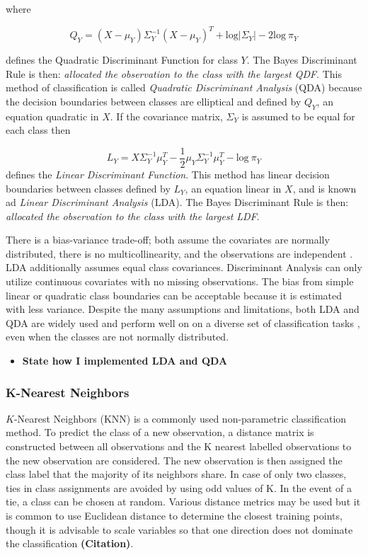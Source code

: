 \documentclass[12pt,]{article}
\providecommand{\tightlist}{%
  \setlength{\itemsep}{0pt}\setlength{\parskip}{0pt}}
\begin{document}
where

\[
Q_Y = (X - \mu_Y) \Sigma^{-1}_Y (X - \mu_Y)^T + \text{log} \vert \Sigma_Y \vert - 2\text{log} ~\pi_Y   \tag{5}
\]

defines the Quadratic Discriminant Function for class \(Y\). The Bayes
Discriminant Rule is then: \emph{allocated the observation to the class
with the largest QDF}. This method of classification is called
\emph{Quadratic Discriminant Analysis} (QDA) because the decision
boundaries between classes are elliptical and defined by \(Q_Y\), an
equation quadratic in \(X\). If the covariance matrix, \(\Sigma_Y\) is
assumed to be equal for each class then

\[
L_Y = X \Sigma^{-1}_Y \mu_Y^T -\frac{1}{2}\mu_Y \Sigma^{-1}_Y \mu_Y^T  - \text{log} ~\pi_Y     \tag{6}
\] defines the \emph{Linear Discriminant Function}. This method has
linear decision boundaries between classes defined by \(L_Y\), an
equation linear in \(X\), and is known ad \emph{Linear Discriminant
Analysis} (LDA). The Bayes Discriminant Rule is then: \emph{allocated
the observation to the class with the largest LDF}.

There is a bias-variance trade-off; both assume the covariates are
normally distributed, there is no multicollinearity, and the
observations are independent \citep{cover_geometrical_1965}. LDA
additionally assumes equal class covariances. Discriminant Analysis can
only utilize continuous covariates with no missing observations. The
bias from simple linear or quadratic class boundaries can be acceptable
because it is estimated with less variance. Despite the many assumptions
and limitations, both LDA and QDA are widely used and perform well on on
a diverse set of classification tasks \citep{hastie_elements_2009}, even
when the classes are not normally distributed.

\begin{itemize}
\tightlist
\item
  \textbf{State how I implemented LDA and QDA}
\end{itemize}

\subsubsection{K-Nearest Neighbors}\label{k-nearest-neighbors}

\(K\)-Nearest Neighbors (KNN) is a commonly used non-parametric
classification method. To predict the class of a new observation, a
distance matrix is constructed between all observations and the K
nearest labelled observations to the new observation are considered. The
new observation is then assigned the class label that the majority of
its neighbors share. In case of only two classes, ties in class
assignments are avoided by using odd values of K. In the event of a tie,
a class can be chosen at random. Various distance metrics may be used
but it is common to use Euclidean distance to determine the closest
training points, though it is advisable to scale variables so that one
direction does not dominate the classification \textbf{(Citation)}.
\end{document}
